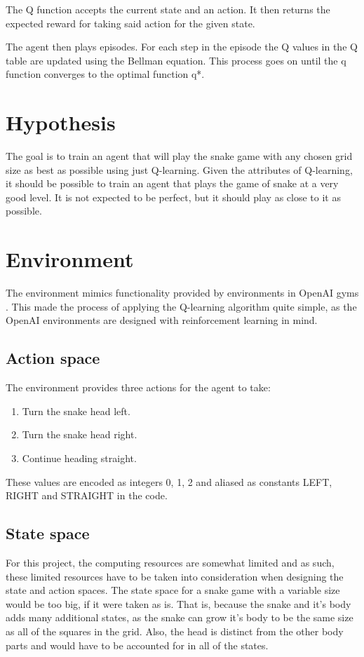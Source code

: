 \documentclass[lettersize,journal]{IEEEtran}
\begin{document}
The Q function accepts the current state and an action. It then
returns the expected reward for taking said action for the given
state.

The agent then plays episodes. For each step in the episode
the Q values in the Q table are updated using the Bellman
equation. This process goes on until the q function converges
to the optimal function q*.

\section{Hypothesis}
The goal is to train an agent that will play the snake game
with any chosen grid size as best as possible using just Q-learning.
Given the attributes of Q-learning, it should be possible to train
an agent that plays the game of snake at a very good level. It
is not expected to be perfect, but it should play as close to it
as possible.

\section{Environment}
The environment mimics functionality provided by environments in
OpenAI gyms \cite{openai}. This made the process of applying the Q-learning
algorithm quite simple, as the OpenAI environments are designed
with reinforcement learning in mind.

\subsection{Action space}

The environment provides three actions for the agent to take:
\begin{enumerate}
    \item Turn the snake head left.
    \item Turn the snake head right.
    \item Continue heading straight.
\end{enumerate}
These values are encoded as integers 0, 1, 2 and aliased as
constants LEFT, RIGHT and STRAIGHT in the code.


\subsection{State space}
For this project, the computing resources are somewhat limited and
as such, these limited resources have to be taken into consideration
when designing the state and action spaces.
The state space for a snake game with a variable size would be
too big, if it were taken as is. That is, because the snake and
it's body adds many additional states, as the snake can grow it's body to
be the same size as all of the squares in the grid. Also, the head is distinct
from the other body parts and would have to be accounted for in all of the states.
\end{document}
